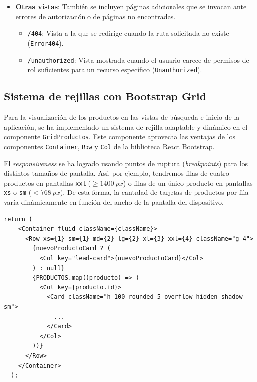 \documentclass[11pt]{article}
\begin{document}
\begin{itemize}
\begin{itemize}
\begin{itemize}
                          \end{itemize}
                \end{itemize}
          \item \textbf{Otras vistas}: También se incluyen páginas adicionales que se invocan ante errores de autorización o de páginas no encontradas.
                \begin{itemize}
                    \item \texttt{/404}: Vista a la que se redirige cuando la ruta solicitada no existe (\texttt{Error404}).
                    \item \texttt{/unauthorized}: Vista mostrada cuando el usuario carece de permisos de rol suficientes para un recurso específico (\texttt{Unauthorized}).
                \end{itemize}
      \end{itemize}

  \subsection{Sistema de rejillas con Bootstrap Grid}

      Para la visualización de los productos en las vistas de búsqueda e inicio de la
      aplicación, se ha implementado un sistema de rejilla adaptable y dinámico en el
      componente \texttt{GridProductos}. Este componente aprovecha las ventajas de
      los componentes \texttt{Container}, \texttt{Row} y \texttt{Col} de la
      biblioteca React Bootstrap.

      El \textit{responsiveness} se ha logrado usando puntos de ruptura
      (\textit{breakpoints}) para los distintos tamaños de pantalla. Así, por
      ejemplo, tendremos filas de cuatro productos en pantallas \texttt{xxl} (\(\ge
      1400\ px\)) o filas de un único producto en pantallas \texttt{xs} o \texttt{sm}
      (\(< 768\ px\)). De esta forma, la cantidad de tarjetas de productos por fila
      varía dinámicamente en función del ancho de la pantalla del dispositivo.

      \begin{lstlisting}[style=ReactStyle]
  return (
    <Container fluid className={className}>
      <Row xs={1} sm={1} md={2} lg={2} xl={3} xxl={4} className="g-4">
        {nuevoProductoCard ? (
          <Col key="lead-card">{nuevoProductoCard}</Col>
        ) : null}
        {PRODUCTOS.map((producto) => (
          <Col key={producto.id}>
            <Card className="h-100 rounded-5 overflow-hidden shadow-sm">
              ...
            </Card>
          </Col>
        ))}
      </Row>
    </Container>
  );
\end{lstlisting}
\end{document}
